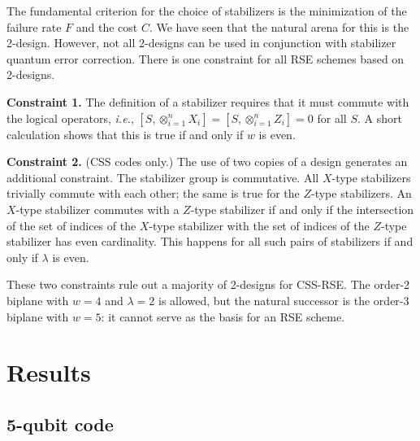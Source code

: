 \documentclass[reprint, superscriptaddress]{revtex4-1}
\numberwithin{equation}{section}
\numberwithin{figure}{section}
\numberwithin{table}{section}
\begin{document}
The fundamental criterion for the choice of stabilizers is the minimization of the failure rate $F$ and the cost $C$.  We have seen that the natural arena for this is the 2-design.  However, not all 2-designs can be used in conjunction with stabilizer quantum error correction.  There is one constraint for all RSE schemes based on 2-designs.

\textbf{Constraint 1.}
The definition of a stabilizer requires that it must commute with the logical operators, \textit{i.e.}, $[S, \otimes_{i=1}^{n}X_i] = [S, \otimes_{i=1}^{n}Z_i]=0$ for all $S$.  A short calculation shows that this is true if and only if $w$ is even.

\textbf{Constraint 2.}
(CSS codes only.) The use of two copies of a design generates an additional constraint. The stabilizer group is commutative.  All $X$-type stabilizers trivially commute with each other; the same is true for the $Z$-type stabilizers.  An $X$-type stabilizer commutes with a $Z$-type stabilizer if and only if the intersection of the set of indices of the $X$-type stabilizer with the set of indices of the $Z$-type stabilizer has even cardinality.  This happens for all such pairs of stabilizers if and only if $\lambda$ is even. 

These two constraints rule out a majority of 2-designs for CSS-RSE.  The order-2 biplane with $w=4$ and $\lambda=2$ is allowed, but the natural successor is the order-3 biplane with $w=5$: it cannot serve as the basis for an RSE scheme.   


\section{Results}

\subsection{5-qubit code}
\end{document}
